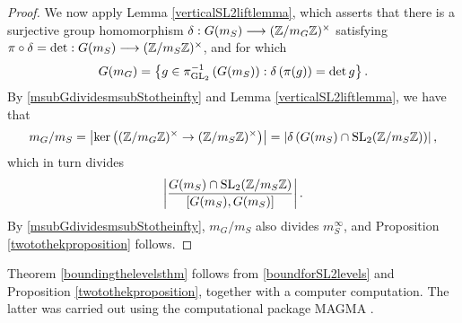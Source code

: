 \begin{proof}
We now apply Lemma \ref{verticalSL2liftlemma}, which asserts that there is a surjective group homomorphism $\delta : G(m_S) \longrightarrow (\mathbb{Z}/m_G\mathbb{Z})^\times$ satisfying $\pi \circ \delta = \det : G(m_S) \longrightarrow (\mathbb{Z}/m_S\mathbb{Z})^\times$, and for which
\[
G(m_G) = \left\{ g \in \pi_{\operatorname{GL}_2}^{-1}\left( G(m_S) \right) : \delta\left( \pi(g) \right) = \det g \right\}.
\]
By \eqref{msubGdividesmsubStotheinfty} and Lemma \ref{verticalSL2liftlemma}, we have that
\[
m_G/m_S = \left| \ker \left( (\mathbb{Z}/m_G\mathbb{Z})^\times \rightarrow (\mathbb{Z}/m_S\mathbb{Z})^\times \right) \right| = \left| \delta\left( G(m_S) \cap \operatorname{SL}_2(\mathbb{Z}/m_S\mathbb{Z}) \right) \right|,
\]
which in turn divides
\[
\left| \frac{G(m_S) \cap \operatorname{SL}_2(\mathbb{Z}/m_S\mathbb{Z})}{[G(m_S),G(m_S)]} \right|.
\]
By \eqref{msubGdividesmsubStotheinfty}, $m_G/m_S$ also divides $m_S^\infty$, and Proposition \ref{twotothekproposition} follows.
\end{proof}
Theorem \ref{boundingthelevelsthm} follows from \eqref{boundforSL2levels} and Proposition \ref{twotothekproposition}, together with a computer computation.  The latter was carried out using the computational package MAGMA \cite{MAGMA}.